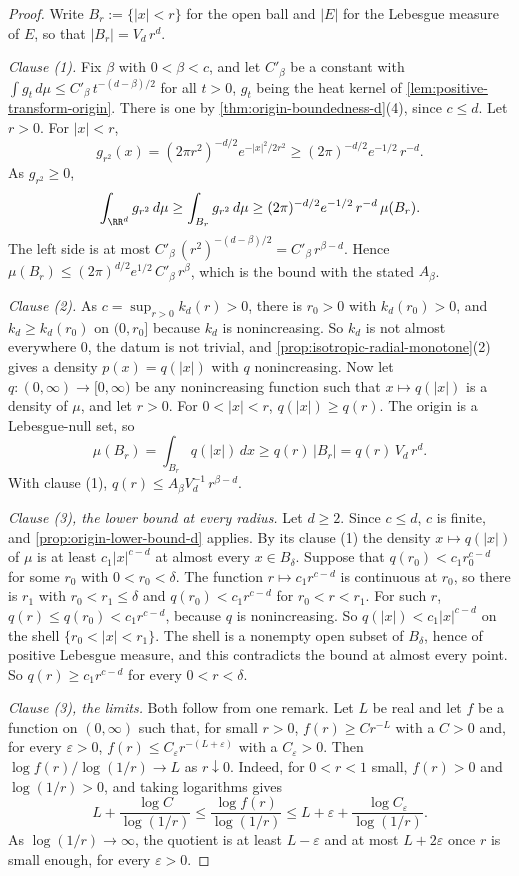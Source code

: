 \begin{proof}
\leanok
Write $B_r := \{|x| < r\}$ for the open ball and $|E|$ for the Lebesgue measure of $E$, so that
$|B_r| = V_d\,r^d$.

\emph{Clause (1).} Fix $\beta$ with $0 < \beta < c$, and let $C'_\beta$ be a constant with
$\int g_t\,d\mu \le C'_\beta\,t^{-(d-\beta)/2}$ for all $t > 0$, $g_t$ being the heat kernel of
\ref{lem:positive-transform-origin}. There is one by \ref{thm:origin-boundedness-d}(4), since
$c \le d$. Let $r > 0$. For $|x| < r$,
\[
  g_{r^2}(x) = (2\pi r^2)^{-d/2}e^{-|x|^2/2r^2} \ge (2\pi)^{-d/2}e^{-1/2}\,r^{-d} .
\]
As $g_{r^2} \ge 0$,
\[
  \int_{\RR^d} g_{r^2}\,d\mu \ge \int_{B_r} g_{r^2}\,d\mu
   \ge (2\pi)^{-d/2}e^{-1/2}\,r^{-d}\,\mu(B_r) .
\]
The left side is at most $C'_\beta\,(r^2)^{-(d-\beta)/2} = C'_\beta\,r^{\beta-d}$. Hence
$\mu(B_r) \le (2\pi)^{d/2}e^{1/2}\,C'_\beta\,r^{\beta}$, which is the bound with the stated
$A_\beta$.

\emph{Clause (2).} As $c = \sup_{r>0}k_d(r) > 0$, there is $r_0 > 0$ with $k_d(r_0) > 0$, and
$k_d \ge k_d(r_0)$ on $(0,r_0]$ because $k_d$ is nonincreasing. So $k_d$ is not almost everywhere
$0$, the datum is not trivial, and \ref{prop:isotropic-radial-monotone}(2) gives a density
$p(x) = q(|x|)$ with $q$ nonincreasing. Now let $q : (0,\infty) \to [0,\infty)$ be any
nonincreasing function such that $x \mapsto q(|x|)$ is a density of $\mu$, and let $r > 0$. For
$0 < |x| < r$, $q(|x|) \ge q(r)$. The origin is a Lebesgue-null set, so
\[
  \mu(B_r) = \int_{B_r} q(|x|)\,dx \ge q(r)\,|B_r| = q(r)\,V_d\,r^d .
\]
With clause (1), $q(r) \le A_\beta V_d^{-1}\,r^{\beta-d}$.

\emph{Clause (3), the lower bound at every radius.} Let $d \ge 2$. Since $c \le d$, $c$ is finite,
and \ref{prop:origin-lower-bound-d} applies. By its clause (1) the density $x \mapsto q(|x|)$ of
$\mu$ is at least $c_1|x|^{c-d}$ at almost every $x \in B_\delta$. Suppose that
$q(r_0) < c_1 r_0^{c-d}$ for some $r_0$ with $0 < r_0 < \delta$. The function
$r \mapsto c_1 r^{c-d}$ is continuous at $r_0$, so there is $r_1$ with $r_0 < r_1 \le \delta$ and
$q(r_0) < c_1 r^{c-d}$ for $r_0 < r < r_1$. For such $r$, $q(r) \le q(r_0) < c_1 r^{c-d}$,
because $q$ is nonincreasing. So $q(|x|) < c_1|x|^{c-d}$ on the shell $\{r_0 < |x| < r_1\}$. The
shell is a nonempty open subset of $B_\delta$, hence of positive Lebesgue measure, and this
contradicts the bound at almost every point. So $q(r) \ge c_1 r^{c-d}$ for every $0 < r < \delta$.

\emph{Clause (3), the limits.} Both follow from one remark. Let $L$ be real and let $f$ be a
function on $(0,\infty)$ such that, for small $r > 0$, $f(r) \ge C r^{-L}$ with a $C > 0$ and, for
every $\varepsilon > 0$, $f(r) \le C_\varepsilon r^{-(L+\varepsilon)}$ with a
$C_\varepsilon > 0$. Then $\log f(r)/\log(1/r) \to L$ as $r \downarrow 0$. Indeed, for
$0 < r < 1$ small, $f(r) > 0$ and $\log(1/r) > 0$, and taking logarithms gives
\[
  L + \frac{\log C}{\log(1/r)} \le \frac{\log f(r)}{\log(1/r)}
   \le L + \varepsilon + \frac{\log C_\varepsilon}{\log(1/r)} .
\]
As $\log(1/r) \to \infty$, the quotient is at least $L - \varepsilon$ and at most
$L + 2\varepsilon$ once $r$ is small enough, for every $\varepsilon > 0$.


\end{proof}
